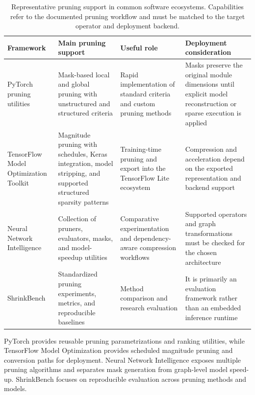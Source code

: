 \documentclass[
    a4paper,
    12pt,
    titlepage,
    bibliography=totoc,
    twoside=on,
    parskip=false,
    numbers=noenddot,
    cleardoublepage=empty,
    DIV=12,
    BCOR=12.0mm,
    headheight=36pt,
    headings=openright
]{scrreprt}
\begin{document}
\begin{table}[htbp]
    \centering
    \small
    \caption[Representative software support for neural-network pruning.]{Representative pruning support in common software ecosystems. Capabilities refer to the documented pruning workflow and must be matched to the target operator and deployment backend.}
    \label{tab:fundamental_pruning_frameworks}
    \begin{tabularx}{\textwidth}{>{\raggedright\arraybackslash}p{3.0cm}>{\raggedright\arraybackslash}p{3.4cm}YY}
        \toprule
        Framework & Main pruning support & Useful role & Deployment consideration \\
        \midrule
        PyTorch pruning utilities & Mask-based local and global pruning with unstructured and structured criteria & Rapid implementation of standard criteria and custom pruning methods & Masks preserve the original module dimensions until explicit model reconstruction or sparse execution is applied \\
        TensorFlow Model Optimization Toolkit & Magnitude pruning with schedules, Keras integration, model stripping, and supported structured sparsity patterns & Training-time pruning and export into the TensorFlow Lite ecosystem & Compression and acceleration depend on the exported representation and backend support \\
        Neural Network Intelligence & Collection of pruners, evaluators, masks, and model-speedup utilities & Comparative experimentation and dependency-aware compression workflows & Supported operators and graph transformations must be checked for the chosen architecture \\
        ShrinkBench & Standardized pruning experiments, metrics, and reproducible baselines & Method comparison and research evaluation & It is primarily an evaluation framework rather than an embedded inference runtime \\
        \bottomrule
    \end{tabularx}
\end{table}

PyTorch provides reusable pruning parametrizations and ranking utilities, while TensorFlow Model Optimization provides scheduled magnitude pruning and conversion paths for deployment.\autocite{paszkePyTorchImperativeStyle2019,pytorchPruningTutorial2026,tensorflowPruningGuide2026} Neural Network Intelligence exposes multiple pruning algorithms and separates mask generation from graph-level model speed-up.\autocite{microsoftNNIPruning2023} ShrinkBench focuses on reproducible evaluation across pruning methods and models.\autocite{blalockWhatStateNeural2020}
\end{document}
